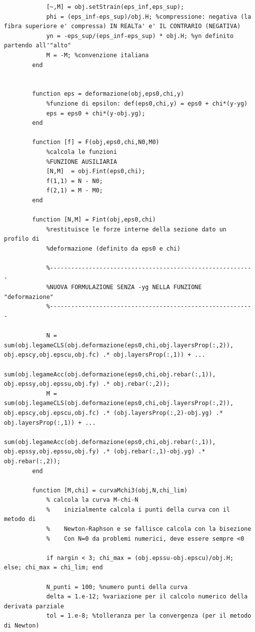 \documentclass[10pt]{article}
\begin{document}
\begin{lstlisting}
            [~,M] = obj.setStrain(eps_inf,eps_sup);
            phi = (eps_inf-eps_sup)/obj.H; %compressione: negativa (la fibra superiore e' compressa) IN REALTa' e' IL CONTRARIO (NEGATIVA)
            yn = -eps_sup/(eps_inf-eps_sup) * obj.H; %yn definito partendo all'"alto"
            M = -M; %convenzione italiana
        end

        
        function eps = deformazione(obj,eps0,chi,y)
            %funzione di epsilon: def(eps0,chi,y) = eps0 + chi*(y-yg)
            eps = eps0 + chi*(y-obj.yg);
        end
        
        function [f] = F(obj,eps0,chi,N0,M0)
            %calcola le funzioni
            %FUNZIONE AUSILIARIA
            [N,M]  = obj.Fint(eps0,chi);
            f(1,1) = N - N0;
            f(2,1) = M - M0;
        end
        
        function [N,M] = Fint(obj,eps0,chi)
            %restituisce le forze interne della sezione dato un profilo di
            %deformazione (definito da eps0 e chi)
 
            %----------------------------------------------------------
            %NUOVA FORMULAZIONE SENZA -yg NELLA FUNZIONE "deformazione"
            %----------------------------------------------------------
            
            N = sum(obj.legameCLS(obj.deformazione(eps0,chi,obj.layersProp(:,2)), obj.epscy,obj.epscu,obj.fc) .* obj.layersProp(:,1)) + ...
                sum(obj.legameAcc(obj.deformazione(eps0,chi,obj.rebar(:,1)), obj.epssy,obj.epssu,obj.fy) .* obj.rebar(:,2));
            M = sum(obj.legameCLS(obj.deformazione(eps0,chi,obj.layersProp(:,2)), obj.epscy,obj.epscu,obj.fc) .* (obj.layersProp(:,2)-obj.yg) .* obj.layersProp(:,1)) + ...
                sum(obj.legameAcc(obj.deformazione(eps0,chi,obj.rebar(:,1)), obj.epssy,obj.epssu,obj.fy) .* (obj.rebar(:,1)-obj.yg) .* obj.rebar(:,2));
        end
        
        function [M,chi] = curvaMchi3(obj,N,chi_lim)
            % calcola la curva M-chi-N
            %    inizialmente calcola i punti della curva con il metodo di
            %    Newton-Raphson e se fallisce calcola con la bisezione
            %    Con N=0 da problemi numerici, deve essere sempre <0
            
            if nargin < 3; chi_max = (obj.epssu-obj.epscu)/obj.H; else; chi_max = chi_lim; end
            
            N_punti = 100; %numero punti della curva
            delta = 1.e-12; %variazione per il calcolo numerico della derivata parziale
            tol = 1.e-8; %tolleranza per la convergenza (per il metodo di Newton)
            

\end{lstlisting}
\end{document}

